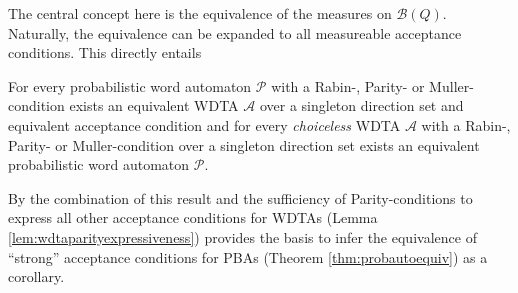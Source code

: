 The central concept here is the equivalence of the measures on 
$\mathcal{B}(Q)$. Naturally, the equivalence can be expanded to all measureable
acceptance conditions. This directly entails
\begin{corollary}
  For every probabilistic word automaton $\mathcal{P}$ with a Rabin-, Parity- 
  or Muller-condition exists an equivalent \ac{WDTA} $\mathcal{A}$ over a 
  singleton direction set and equivalent acceptance condition and for 
  every \emph{choiceless} \ac{WDTA} $\mathcal{A}$ with a Rabin-, Parity- or
  Muller-condition over a singleton direction set exists an equivalent
  probabilistic word automaton $\mathcal{P}$.
\end{corollary}
By the combination of this result and the sufficiency of Parity-conditions to
express all other acceptance conditions for \acp{WDTA} (Lemma 
\ref{lem:wdtaparityexpressiveness}) provides the basis to infer the equivalence 
of \enquote{strong} acceptance conditions for \acp{PBA} (Theorem 
\ref{thm:probautoequiv}) as a corollary.

